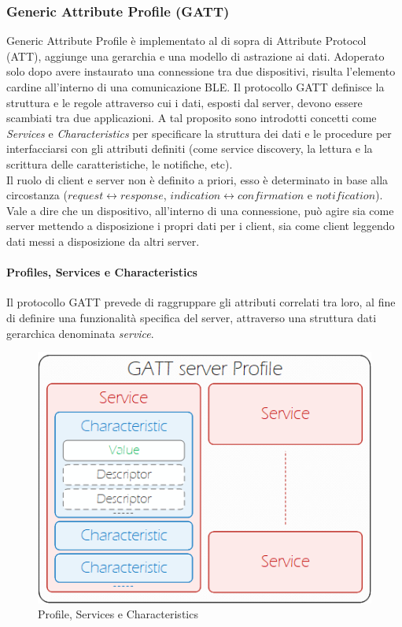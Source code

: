 \subsubsection{Generic Attribute Profile (GATT)}
Generic Attribute Profile è implementato al di sopra di Attribute Protocol (ATT), aggiunge una gerarchia e una modello di astrazione ai dati. Adoperato solo dopo avere instaurato una connessione tra due dispositivi, risulta l'elemento cardine all'interno di una comunicazione BLE. Il protocollo GATT definisce la struttura e le regole attraverso cui i dati, esposti dal server, devono essere scambiati tra due applicazioni. A tal proposito sono introdotti concetti come \textit{Services} e \textit{Characteristics} per specificare la struttura dei dati e le procedure per interfacciarsi con gli attributi definiti (come service discovery, la lettura e  la scrittura delle caratteristiche, le notifiche, etc).\\
Il ruolo di client e server non è definito a priori, esso è determinato in base alla circostanza ($request \leftrightarrow{response}$, $indication \leftrightarrow{confirmation}$ e $notification$). Vale a dire che un dispositivo, all'interno di una connessione, può agire sia come server mettendo a disposizione i propri dati per i client, sia come client leggendo dati messi a disposizione da altri server.

\paragraph{Profiles, Services e Characteristics}
Il protocollo GATT prevede di raggruppare gli attributi correlati tra loro, al fine di definire una funzionalità specifica del server, attraverso una struttura dati gerarchica denominata \textit{service}.

\begin{figure}[!ht]
    \centering
    \includegraphics[width =\textwidth]{images/Services GATT.png}
    \caption{Profile, Services e Characteristics}
    \label{fig:profile_GATT}
\end{figure}

